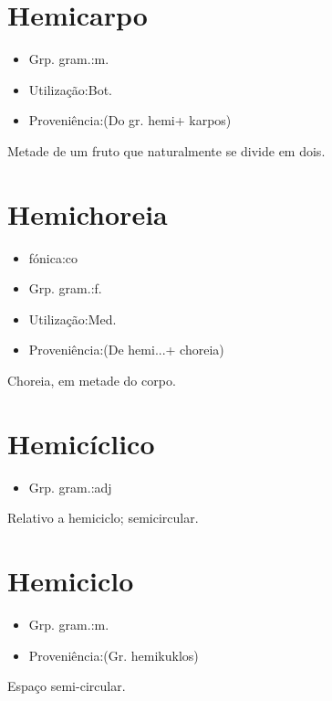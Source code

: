 \documentclass{article}
\begin{document}
\section{Hemicarpo}
\begin{itemize}
\item {Grp. gram.:m.}
\end{itemize}
\begin{itemize}
\item {Utilização:Bot.}
\end{itemize}
\begin{itemize}
\item {Proveniência:(Do gr. \textunderscore hemi\textunderscore  + \textunderscore karpos\textunderscore )}
\end{itemize}
Metade de um fruto que naturalmente se divide em dois.
\section{Hemichoreia}
\begin{itemize}
\item {fónica:co}
\end{itemize}
\begin{itemize}
\item {Grp. gram.:f.}
\end{itemize}
\begin{itemize}
\item {Utilização:Med.}
\end{itemize}
\begin{itemize}
\item {Proveniência:(De \textunderscore hemi...\textunderscore  + \textunderscore choreia\textunderscore )}
\end{itemize}
Choreia, em metade do corpo.
\section{Hemicíclico}
\begin{itemize}
\item {Grp. gram.:adj}
\end{itemize}
Relativo a hemiciclo; semicircular.
\section{Hemiciclo}
\begin{itemize}
\item {Grp. gram.:m.}
\end{itemize}
\begin{itemize}
\item {Proveniência:(Gr. \textunderscore hemikuklos\textunderscore )}
\end{itemize}
Espaço semi-circular.
\end{document}
